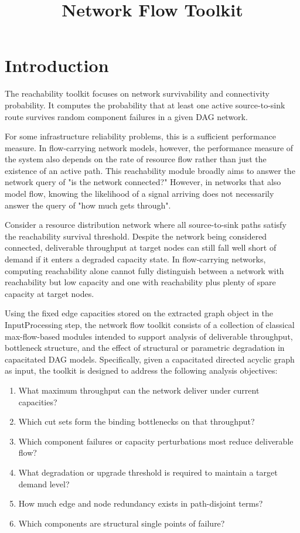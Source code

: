 \documentclass[12pt]{report}
\begin{document}
\title{Network Flow Toolkit}
\fi


\section{Introduction}
The reachability toolkit focuses on network survivability and connectivity probability. It computes the probability that at least one active source-to-sink route survives random component failures in a given DAG network.

For some infrastructure reliability problems, this is a sufficient performance measure. In flow-carrying network models, however, the performance measure of the system also depends on the rate of resource flow rather than just the existence of an active path. This reachability module broadly aims to answer the network query of "is the network connected?" However, in networks that also model flow, knowing the likelihood of a signal arriving does not necessarily answer the query of "how much gets through".

Consider a resource distribution network where all source-to-sink paths satisfy the reachability survival threshold. Despite the network being considered connected, deliverable throughput at target nodes can still fall well short of demand if it enters a degraded capacity state. In flow-carrying networks, computing reachability alone cannot fully distinguish between a network with reachability but low capacity and one with reachability plus plenty of spare capacity at target nodes. 

Using the fixed edge capacities stored on the extracted graph object in the InputProcessing step, the network flow toolkit consists of a collection of classical max-flow-based modules intended to support analysis of deliverable throughput, bottleneck structure, and the effect of structural or parametric degradation in capacitated DAG models.
Specifically, given a capacitated directed acyclic graph as input, the toolkit is designed to address the following analysis objectives:
\begin{enumerate}[label=\textbf{Q\arabic*.}]
    \item What maximum throughput can the network deliver under current capacities?
    \item Which cut sets form the binding bottlenecks on that throughput?
    \item Which component failures or capacity perturbations most reduce deliverable flow?
    \item What degradation or upgrade threshold is required to maintain a target demand level?
    \item How much edge and node redundancy exists in path-disjoint terms?
    \item Which components are structural single points of failure?
\end{enumerate}
\end{document}
